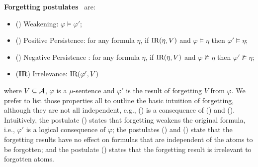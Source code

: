\documentclass[runningheads]{llncs}
\begin{document}
\textbf{Forgetting postulates}~\cite{Yan:AIJ:2009} are:
\begin{itemize}
  \item[] (\W) Weakening: $\varphi \models \varphi'$;
  \item[] (\PP) Positive Persistence:
  for any formula $\eta$, if $\textrm{IR}(\eta, V)$ and $\varphi \models \eta$ then $\varphi' \models \eta$;
  \item[] (\NgP) Negative Persistence :  for any formula $\eta$,  if $\textrm{IR}(\eta, V)$ and $\varphi \not \models \eta$ then $\varphi' \not \models \eta$;
  \item[] (\textbf{IR}) Irrelevance: $\textrm{IR}(\varphi', V)$
\end{itemize}
where $V\subseteq\cal A$,
$\varphi$ is a $\mu$-sentence and $\varphi'$ is the result of
forgetting $V$ from $\varphi$.
%
We prefer to list those properties all to outline the basic intuition of forgetting, although they are not all independent,  e.g., (\NgP) is a consequence of (\W) and (\PP).
Intuitively, the postulate (\W) states that forgetting weakens the original formula, i.e., $\varphi'$ is a logical consequence of $\varphi$; the postulates  (\PP) and (\NgP)
state that the forgetting results have no effect on formulas that are independent of the atoms to be forgotten; and the postulate (\textbf{\IR}) states that the
forgetting result is irrelevant to forgotten atoms.

\end{document}
